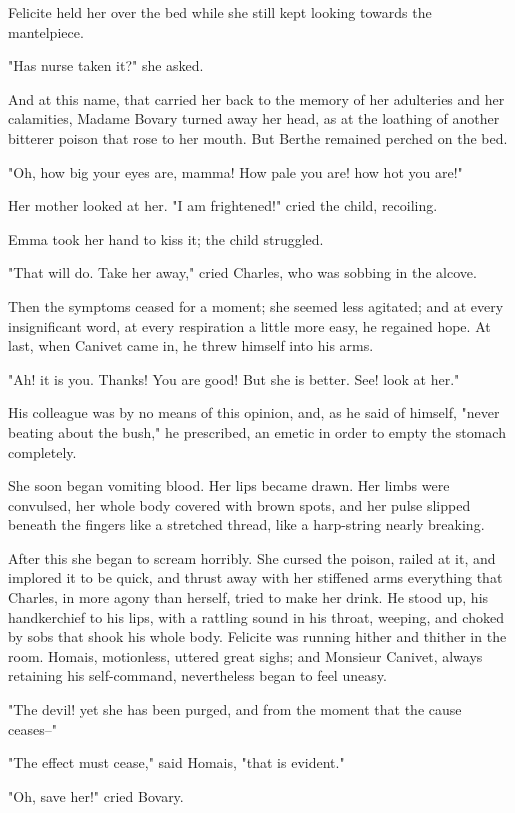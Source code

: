 \documentclass[11pt,twocolumn]{ltugboat}
\begin{document}
Felicite held her over the bed while she still kept looking towards the
mantelpiece.

"Has nurse taken it?" she asked.

And at this name, that carried her back to the memory of her adulteries
and her calamities, Madame Bovary turned away her head, as at the
loathing of another bitterer poison that rose to her mouth. But Berthe
remained perched on the bed.

"Oh, how big your eyes are, mamma! How pale you are! how hot you are!"

Her mother looked at her. "I am frightened!" cried the child, recoiling.

Emma took her hand to kiss it; the child struggled.

"That will do. Take her away," cried Charles, who was sobbing in the
alcove.

Then the symptoms ceased for a moment; she seemed less agitated; and at
every insignificant word, at every respiration a little more easy, he
regained hope. At last, when Canivet came in, he threw himself into his
arms.

"Ah! it is you. Thanks! You are good! But she is better. See! look at
her."

His colleague was by no means of this opinion, and, as he said of
himself, "never beating about the bush," he prescribed, an emetic in
order to empty the stomach completely.

She soon began vomiting blood. Her lips became drawn. Her limbs were
convulsed, her whole body covered with brown spots, and her pulse
slipped beneath the fingers like a stretched thread, like a harp-string
nearly breaking.

After this she began to scream horribly. She cursed the poison, railed
at it, and implored it to be quick, and thrust away with her stiffened
arms everything that Charles, in more agony than herself, tried to make
her drink. He stood up, his handkerchief to his lips, with a rattling
sound in his throat, weeping, and choked by sobs that shook his whole
body. Felicite was running hither and thither in the room. Homais,
motionless, uttered great sighs; and Monsieur Canivet, always retaining
his self-command, nevertheless began to feel uneasy.

"The devil! yet she has been purged, and from the moment that the cause
ceases--"

"The effect must cease," said Homais, "that is evident."

"Oh, save her!" cried Bovary.
\end{document}
